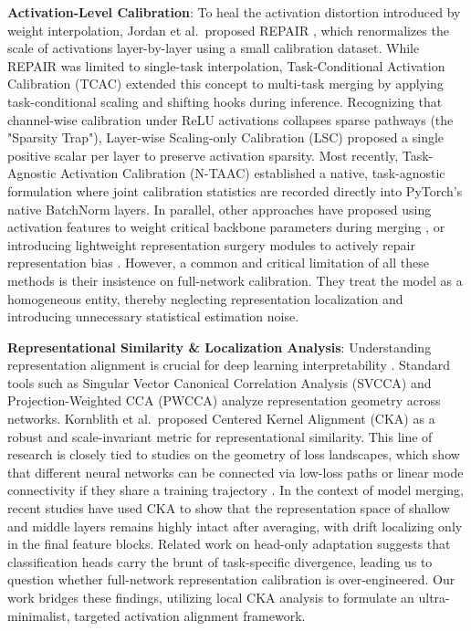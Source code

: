 \documentclass{article}
\theoremstyle{plain}
\theoremstyle{definition}
\begin{document}
\textbf{Activation-Level Calibration}: To heal the activation distortion introduced by weight interpolation, Jordan et al.\ proposed REPAIR \cite{jordan2022repair}, which renormalizes the scale of activations layer-by-layer using a small calibration dataset. While REPAIR was limited to single-task interpolation, Task-Conditional Activation Calibration (TCAC) extended this concept to multi-task merging by applying task-conditional scaling and shifting hooks during inference. Recognizing that channel-wise calibration under ReLU activations collapses sparse pathways (the "Sparsity Trap"), Layer-wise Scaling-only Calibration (LSC) \cite{submission9} proposed a single positive scalar per layer to preserve activation sparsity. Most recently, Task-Agnostic Activation Calibration (N-TAAC) \cite{submission3} established a native, task-agnostic formulation where joint calibration statistics are recorded directly into PyTorch's native BatchNorm layers. In parallel, other approaches have proposed using activation features to weight critical backbone parameters during merging \cite{nobari2025activation}, or introducing lightweight representation surgery modules to actively repair representation bias \cite{yang2024representation}. However, a common and critical limitation of all these methods is their insistence on full-network calibration. They treat the model as a homogeneous entity, thereby neglecting representation localization and introducing unnecessary statistical estimation noise.

\textbf{Representational Similarity \& Localization Analysis}: Understanding representation alignment is crucial for deep learning interpretability \cite{bengio2013representation}. Standard tools such as Singular Vector Canonical Correlation Analysis (SVCCA) \cite{raghu2017svcca} and Projection-Weighted CCA (PWCCA) \cite{morcos2018insights} analyze representation geometry across networks. Kornblith et al.\ proposed Centered Kernel Alignment (CKA) \cite{kornblith2019similarity} as a robust and scale-invariant metric for representational similarity. This line of research is closely tied to studies on the geometry of loss landscapes, which show that different neural networks can be connected via low-loss paths or linear mode connectivity if they share a training trajectory \cite{garipov2018loss, draxler2018essentially, frankle2020linear}. In the context of model merging, recent studies \cite{submission10} have used CKA to show that the representation space of shallow and middle layers remains highly intact after averaging, with drift localizing only in the final feature blocks. Related work on head-only adaptation \cite{methodologist2026deconstructing} suggests that classification heads carry the brunt of task-specific divergence, leading us to question whether full-network representation calibration is over-engineered. Our work bridges these findings, utilizing local CKA analysis to formulate an ultra-minimalist, targeted activation alignment framework.
\end{document}
